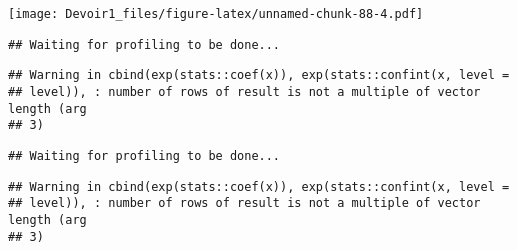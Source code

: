 \documentclass[]{article}
\newenvironment{Shaded}{\begin{snugshade}}{\end{snugshade}}
\newcommand{\KeywordTok}[1]{\textcolor[rgb]{0.13,0.29,0.53}{\textbf{#1}}}
\newcommand{\DataTypeTok}[1]{\textcolor[rgb]{0.13,0.29,0.53}{#1}}
\newcommand{\DecValTok}[1]{\textcolor[rgb]{0.00,0.00,0.81}{#1}}
\newcommand{\StringTok}[1]{\textcolor[rgb]{0.31,0.60,0.02}{#1}}
\newcommand{\OperatorTok}[1]{\textcolor[rgb]{0.81,0.36,0.00}{\textbf{#1}}}
\newcommand{\NormalTok}[1]{#1}
\begin{document}
\texttt{[image: Devoir1\_files/figure-latex/unnamed-chunk-88-4.pdf]}

\begin{Shaded}
\end{Shaded}

\begin{verbatim}
## Waiting for profiling to be done...
\end{verbatim}

\begin{verbatim}
## Warning in cbind(exp(stats::coef(x)), exp(stats::confint(x, level =
## level)), : number of rows of result is not a multiple of vector length (arg
## 3)
\end{verbatim}

\begin{verbatim}
## Waiting for profiling to be done...
\end{verbatim}

\begin{verbatim}
## Warning in cbind(exp(stats::coef(x)), exp(stats::confint(x, level =
## level)), : number of rows of result is not a multiple of vector length (arg
## 3)
\end{verbatim}
\end{document}
